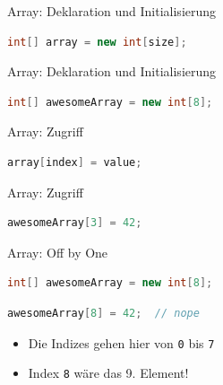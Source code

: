 \documentclass[18pt]{beamer}
\begin{document}
\begin{frame}[fragile]{Array: Deklaration und Initialisierung}
    \begin{lstlisting}[language=Java,basicstyle=\large]
int[] array = new int[size];
    \end{lstlisting}
\end{frame}

\begin{frame}[fragile]{Array: Deklaration und Initialisierung}
    \begin{exampleblock}{}
        \begin{lstlisting}[language=Java,basicstyle=\large]
int[] awesomeArray = new int[8];
        \end{lstlisting}
    \end{exampleblock}
\end{frame}

\begin{frame}[fragile]{Array: Zugriff}
        \begin{lstlisting}[language=Java,basicstyle=\large]
array[index] = value;
        \end{lstlisting}
\end{frame}

\begin{frame}[fragile]{Array: Zugriff}
    \begin{exampleblock}{}
        \begin{lstlisting}[language=Java,basicstyle=\large]
awesomeArray[3] = 42;
        \end{lstlisting}
    \end{exampleblock}
\end{frame}

\begin{frame}[fragile]{Array: Off by One}
    \begin{lstlisting}[language=Java,basicstyle=\large]
int[] awesomeArray = new int[8];
    \end{lstlisting}
    \begin{alertblock}{}
        \begin{lstlisting}[language=Java,basicstyle=\large]
awesomeArray[8] = 42;  // nope
        \end{lstlisting}
    \end{alertblock}
    \vspace{.2in}
    \begin{itemize}
        \item Die Indizes gehen hier von \texttt{0} bis \texttt{7}
        \item Index \alert{\texttt{8}} wäre das 9. Element!
    \end{itemize}
\end{frame}
\end{document}
